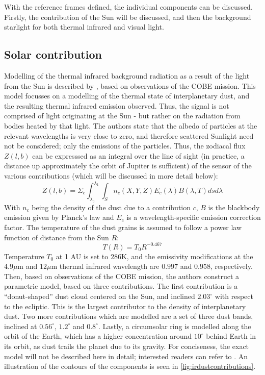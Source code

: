 With the reference frames defined, the individual components can be discussed. Firstly, the contribution of the Sun will be discussed, and then the background starlight for both thermal infrared and visual light.

\subsection{Solar contribution}
Modelling of the thermal infrared background radiation as a result of the light from the Sun is described by \cite{IRDust}, based on observations of the COBE mission. This model focusses on a modelling of the thermal state of interplanetary dust, and the resulting thermal infrared emission observed. Thus, the signal is not comprised of light originating at the Sun - but rather on the radiation from bodies heated by that light. The authors state that the albedo of particles at the relevant wavelengths is very close to zero, and therefore scattered Sunlight need not be considered; only the emissions of the particles. Thus, the zodiacal flux $Z(l, b)$ can be expresssed as an integral over the line of sight (in practice, a distance up approximately the orbit of Jupiter is sufficient) of the sensor of the various contributions (which will be discussed in  more detail below):
\begin{equation}
 Z(l, b) = \Sigma_c \int _{\lambda_0} ^{\lambda_1} \int _S n_{c}(X, Y, Z)  E_{c}(\lambda) B(\lambda, T) ds d\lambda
 \label{eq:irdustflux}
\end{equation}
With $n_c$ being the density of the dust due to a contribution $c$, $B$ is the blackbody emission given by Planck's law and $E_c$ is a wavelength-specific emission correction factor. The temperature of the dust grains is assumed to follow a power law function of distance from the Sun $R$:
\begin{equation}
 T(R) = T_0R^{-0.467}
\end{equation}
Temperature $T_0$ at 1 AU is set to $286\mathrm{K}$, and the emissivity modifications at the $4.9 \mu\mathrm{m}$ and $12 \mu\mathrm{m}$ thermal infrared wavelength are $0.997$ and $0.958$, respectively. Then, based on observations of the COBE mission, the authors construct a parametric model, based on three contributions. The first contribution is a ``donut-shaped'' dust cloud centered on the Sun, and inclined $2.03^\circ$ with respect to the ecliptic. This is the largest contributor to the density of interplanetary dust. Two more contributions which are modelled are a set of three dust bands, inclined at $0.56^\circ$, $1.2^\circ$ and $0.8^\circ$. Lastly, a circumsolar ring is modelled along the orbit of the Earth, which has a higher concentration around $10^\circ$ behind Earth in its orbit, as dust trails the planet due to its gravity. For conciseness, the exact model will not be described here in detail; interested readers can refer to \cite{IRDust}. An illustration of the contours of the components is seen in \autoref{fig:irdustcontributions}.\\

